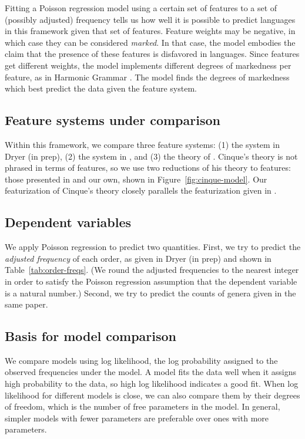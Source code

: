 \documentclass[11pt]{article}
\begin{document}
Fitting a Poisson regression model using a certain set of features to
a set of (possibly adjusted) frequency tells us how well it is
possible to predict languages in this framework given that set of
features.  Feature weights may be negative, in which case they can be
considered \emph{marked}. In that case, the model embodies the claim
that the presence of these features is disfavored in languages.  Since
features get different weights, the model implements different degrees
of markedness per feature, as in Harmonic Grammar
\citep{smolensky2006harmonic}.  The model finds the degrees of
markedness which best predict the data given the feature system.

\subsection{Feature systems under comparison}

Within this framework, we compare three feature systems: (1) the system in Dryer (in prep), (2) the system in \citet{cysouw2010dealing}, and (3) the theory of \citet{cinque2005deriving}. Cinque's theory is not phrased in terms of features, so we use two reductions of his theory to features: those presented in \citet{merlo2015predicting} and our own, shown in Figure~\ref{fig:cinque-model}. Our featurization of Cinque's theory closely parallels the featurization given in \citet{cysouw2010dealing}.

\subsection{Dependent variables}

We apply Poisson regression to predict two quantities. First, we try
to predict the \emph{adjusted frequency} of each order, as given in
Dryer (in prep) and shown in Table~\ref{tab:order-freqs}.  (We round
the adjusted frequencies to the nearest integer in order to satisfy
the Poisson regression assumption that the dependent variable is a
natural number.)  Second, we try to predict the counts of genera given
in the same paper.

\subsection{Basis for model comparison}

We compare models using log likelihood, the log probability assigned to the observed frequencies under the model.
A model fits the data well when it assigns high probability to the data, so high log likelihood indicates a good fit.
When log likelihood for different models is close, we can also compare them by their degrees of freedom, which is the number of free parameters in the model.
In general, simpler models with fewer parameters are preferable over ones with more parameters.
\end{document}
